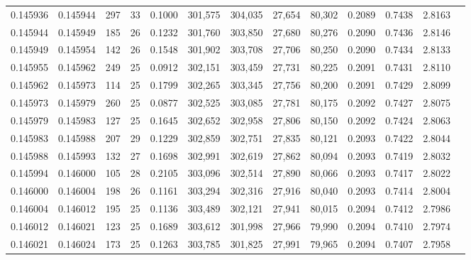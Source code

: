 \begin{tabular}{rrrrrrrrrrrrr}
0.145936 & 0.145944 & 297 &  33 &                                     0.1000 & 301,575 & 304,035 &  27,654 &  80,302 & 0.2089 & 0.7438 & 2.8163 \\
0.145944 & 0.145949 & 185 &  26 &                                     0.1232 & 301,760 & 303,850 &  27,680 &  80,276 & 0.2090 & 0.7436 & 2.8146 \\
0.145949 & 0.145954 & 142 &  26 &                                     0.1548 & 301,902 & 303,708 &  27,706 &  80,250 & 0.2090 & 0.7434 & 2.8133 \\
0.145955 & 0.145962 & 249 &  25 &                                     0.0912 & 302,151 & 303,459 &  27,731 &  80,225 & 0.2091 & 0.7431 & 2.8110 \\
0.145962 & 0.145973 & 114 &  25 &                                     0.1799 & 302,265 & 303,345 &  27,756 &  80,200 & 0.2091 & 0.7429 & 2.8099 \\
0.145973 & 0.145979 & 260 &  25 &                                     0.0877 & 302,525 & 303,085 &  27,781 &  80,175 & 0.2092 & 0.7427 & 2.8075 \\
0.145979 & 0.145983 & 127 &  25 &                                     0.1645 & 302,652 & 302,958 &  27,806 &  80,150 & 0.2092 & 0.7424 & 2.8063 \\
0.145983 & 0.145988 & 207 &  29 &                                     0.1229 & 302,859 & 302,751 &  27,835 &  80,121 & 0.2093 & 0.7422 & 2.8044 \\
0.145988 & 0.145993 & 132 &  27 &                                     0.1698 & 302,991 & 302,619 &  27,862 &  80,094 & 0.2093 & 0.7419 & 2.8032 \\
0.145994 & 0.146000 & 105 &  28 &                                     0.2105 & 303,096 & 302,514 &  27,890 &  80,066 & 0.2093 & 0.7417 & 2.8022 \\
0.146000 & 0.146004 & 198 &  26 &                                     0.1161 & 303,294 & 302,316 &  27,916 &  80,040 & 0.2093 & 0.7414 & 2.8004 \\
0.146004 & 0.146012 & 195 &  25 &                                     0.1136 & 303,489 & 302,121 &  27,941 &  80,015 & 0.2094 & 0.7412 & 2.7986 \\
0.146012 & 0.146021 & 123 &  25 &                                     0.1689 & 303,612 & 301,998 &  27,966 &  79,990 & 0.2094 & 0.7410 & 2.7974 \\
0.146021 & 0.146024 & 173 &  25 &                                     0.1263 & 303,785 & 301,825 &  27,991 &  79,965 & 0.2094 & 0.7407 & 2.7958 \\

\end{tabular}
